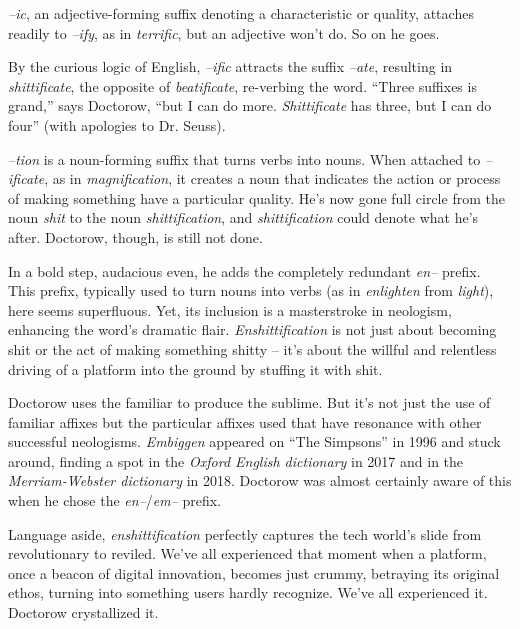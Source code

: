 \textit{--ic}, an adjective-forming suffix denoting a characteristic or quality, attaches readily to \textit{--ify}, as in \textit{terrific}, but an adjective won't do. So on he goes.

By the curious logic of English, \textit{--ific} attracts the suffix \textit{--ate}, resulting in \textit{shittificate}, the opposite of \textit{beatificate}, re-verbing the word. ``Three suffixes is grand,'' says Doctorow, ``but I can do more. \textit{Shittificate} has three, but I can do four'' (with apologies to Dr. Seuss).

\textit{--tion} is a noun-forming suffix that turns verbs into nouns. When attached to \textit{--ificate}, as in \textit{magnification}, it creates a noun that indicates the action or process of making something have a particular quality. He's now gone full circle from the noun \textit{shit} to the noun \textit{shittification}, and \textit{shittification} could denote what he's after. Doctorow, though, is still not done.

In a bold step, audacious even, he adds the completely redundant \textit{en--} prefix. This prefix, typically used to turn nouns into verbs (as in \textit{enlighten} from \textit{light}), here seems superfluous. Yet, its inclusion is a masterstroke in neologism, enhancing the word's dramatic flair. \textit{Enshittification} is not just about becoming shit or the act of making something shitty -- it's about the willful and relentless driving of a platform into the ground by stuffing it with shit.

Doctorow uses the familiar to produce the sublime. But it's not just the use of familiar affixes but the particular affixes used that have resonance with other successful neologisms. \textit{Embiggen} appeared on ``The Simpsons'' in 1996 and stuck around, finding a spot in the \textit{Oxford English dictionary} in 2017 and in the \textit{Merriam-Webster dictionary} in 2018. Doctorow was almost certainly aware of this when he chose the \textit{en--}/\textit{em--} prefix.

Language aside, \textit{enshittification} perfectly captures the tech world's slide from revolutionary to reviled. We've all experienced that moment when a platform, once a beacon of digital innovation, becomes just crummy, betraying its original ethos, turning into something users hardly recognize. We've all experienced it. Doctorow crystallized it.

